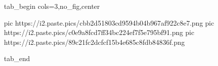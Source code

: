  
 
 
 
 


\ifcmt
  tab_begin cols=3,no_fig,center

     pic https://i2.paste.pics/cbb2d51803cd9594b04b967af922c8e7.png
		 pic https://i2.paste.pics/c0e9a8fcd7ff34bc224ef7f5e795bf91.png
		 pic https://i2.paste.pics/89c21fc2dcfcf15b4e685c8fdb84836f.png

  tab_end
\fi
